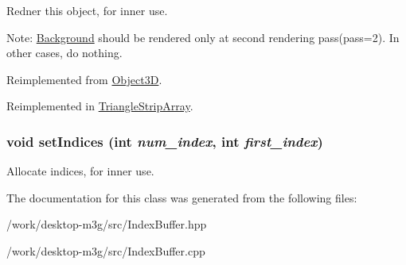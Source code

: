 Redner this object, for inner use.

Note: \hyperlink{classm3g_1_1Background}{Background} should be rendered only at second rendering pass(pass=2). In other cases, do nothing. 

Reimplemented from \hyperlink{classm3g_1_1Object3D_1efcb1973989d9963d5bd6d03065d389}{Object3D}.

Reimplemented in \hyperlink{classm3g_1_1TriangleStripArray_1efcb1973989d9963d5bd6d03065d389}{TriangleStripArray}.\hypertarget{classm3g_1_1IndexBuffer_26c5b78691f0f92bd8589714cc25b6a8}{
\subsubsection[{setIndices}]{\setlength{\rightskip}{0pt plus 5cm}void setIndices (int {\em num\_\-index}, \/  int {\em first\_\-index})}}
\label{classm3g_1_1IndexBuffer_26c5b78691f0f92bd8589714cc25b6a8}


Allocate indices, for inner use. 

The documentation for this class was generated from the following files:\begin{CompactItemize}
\item 
/work/desktop-m3g/src/IndexBuffer.hpp\item 
/work/desktop-m3g/src/IndexBuffer.cpp\end{CompactItemize}
